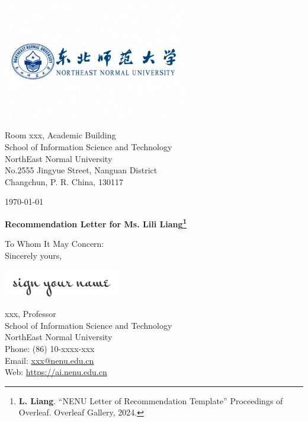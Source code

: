 \documentclass[12pt, a4paper]{letter} %
\begin{document}
    \begin{minipage}{0.5\textwidth}
        \includegraphics[width=3.2in]{pic/nenu_logo.jpeg}\\ %
    \end{minipage}
    \hfill
    \begin{minipage}{0.6\textwidth}\raggedright
        \small{
            \hphantom{AA}Room xxx, Academic Building\\ %
            \hphantom{AA}School of Information Science and Technology\\
            \hphantom{AA}NorthEast Normal University\\
            \hphantom{AA}No.2555 Jingyue Street, Nanguan District\\
            \hphantom{AA}Changchun, P. R. China, 130117
        }
    \end{minipage}

    \today

    \textbf{Recommendation Letter for Ms. Lili Liang\footnote{\textbf{L. Liang}. ``NENU Letter of Recommendation Template'' Proceedings of Overleaf. Overleaf Gallery, 2024.}}

    To Whom It May Concern:\\


    Sincerely yours,

    \includegraphics[width=2in]{pic/signature.png} %

    xxx, Professor\\
    School of Information Science and Technology\\
    NorthEast Normal University\\
    Phone: (86) 10-xxxx-xxx\\ 
    Email: \href{mailto:xxx@nenu.edu.cn}{xxx@nenu.edu.cn}\\
    Web: \url{https://ai.nenu.edu.cn}\\
\end{document}
